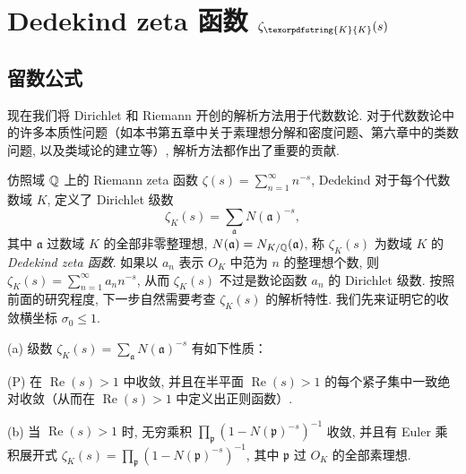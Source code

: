 \section{\texorpdfstring{Dedekind zeta 函数 $\zeta_{\texorpdfstring{K}{K}}(s)$}{Dedekind zeta 函数 zetaK(s)}}\label{sec:ch4-s3}

\subsection{留数公式}\label{sec:ch4-s3-1}

现在我们将 Dirichlet 和 Riemann 开创的解析方法用于代数数论. 对于代数数论中的许多本质性问题（如本书第五章中关于素理想分解和密度问题、第六章中的类数问题, 以及类域论的建立等）, 解析方法都作出了重要的贡献. 

仿照域 $\mathbb{Q}$ 上的 Riemann zeta 函数 $\zeta(s)=\sum_{n=1}^{\infty}n^{-s}$, Dedekind 对于每个代数数域 $K$, 定义了 Dirichlet 级数
\[
  \zeta_K(s)=\sum_{\mathfrak{a}}N(\mathfrak{a})^{-s},
\]
其中 $\mathfrak{a}$ 过数域 $K$ 的全部非零整理想, $N(\mathfrak{a})=N_{K/\mathbb{Q}}(\mathfrak{a})$, 称 $\zeta_K(s)$ 为数域 $K$ 的 \emph{Dedekind zeta 函数}. 如果以 $a_n$ 表示 $O_K$ 中范为 $n$ 的整理想个数, 则 $\zeta_K(s)=\sum_{n=1}^{\infty}a_nn^{-s}$, 从而 $\zeta_K(s)$ 不过是数论函数 $a_n$ 的 Dirichlet 级数. 按照前面的研究程度, 下一步自然需要考查 $\zeta_K(s)$ 的解析特性. 我们先来证明它的收敛横坐标 $\sigma_0\leqslant 1$. 

\begin{theorem}\label{thm:4.12}
(a) 级数 $\zeta_K(s)=\sum_{\mathfrak{a}}N(\mathfrak{a})^{-s}$ 有如下性质：

(P) 在 $\operatorname{Re}(s)>1$ 中收敛, 并且在半平面 $\operatorname{Re}(s)>1$ 的每个紧子集中一致绝对收敛（从而在 $\operatorname{Re}(s)>1$ 中定义出正则函数）. 

(b) 当 $\operatorname{Re}(s)>1$ 时, 无穷乘积 $\prod_{\mathfrak{p}}(1-N(\mathfrak{p})^{-s})^{-1}$ 收敛, 并且有 Euler 乘积展开式 $\zeta_K(s)=\prod_{\mathfrak{p}}(1-N(\mathfrak{p})^{-s})^{-1}$, 其中 $\mathfrak{p}$ 过 $O_K$ 的全部素理想. 
\end{theorem}

